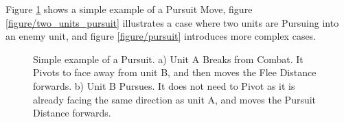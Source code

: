 Figure \ref{figure/simple_pursuit} shows a simple example of a Pursuit Move, figure \ref{figure/two_units_pursuit} illustrates a case where two units are Pursuing into an enemy unit, and figure \ref{figure/pursuit} introduces more complex cases.

\newcommand{\figSimplePursA}{a)}
\newcommand{\figSimplePursB}{b)}

\begin{figure}[!htbp]
	\begin{minipage}{0.52\textwidth}
	\renewcommand{\figbiglettersize}{17}
	\def\svgwidth{\textwidth}
	
	\end{minipage}\hfill\begin{minipage}{0.45\textwidth}
	\caption{Simple example of a Pursuit.\captionpar
	a) Unit A Breaks from Combat. It Pivots to face away from unit B, and then moves the Flee Distance forwards.\captionpar
	b) Unit B Pursues. It does not need to Pivot as it is already facing the same direction as unit A, and moves the Pursuit Distance forwards.}
	\label{figure/simple_pursuit}
	\end{minipage}
\end{figure}


\newcommand{\figTwoPursA}{a)}
\newcommand{\figTwoPursB}{b)}
\newcommand{\figTwoPursC}{c)}
\newcommand{\figTwoPursOne}{\Largefontsize{}\textbf{1}}
\newcommand{\figTwoPursTwo}{\Largefontsize{}\textbf{2}}
\newcommand{\figTwoPursunitA}{\begin{minipage}{0.30\unitlength}\begin{center}\normalfontsize{}Pursuit Distance\par Unit A\end{center}\end{minipage}}
\newcommand{\figTwoPursunitB}{\begin{minipage}{0.30\unitlength}\begin{center}\normalfontsize{}Pursuit Distance\par Unit B\end{center}\end{minipage}}
\newcommand{\figTwoPursunitC}{\begin{minipage}{0.30\unitlength}\begin{center}\normalfontsize{}Pursuit Distance\par Unit C\end{center}\end{minipage}}
\newcommand{\figTwoPursunitD}{\begin{minipage}{0.30\unitlength}\begin{center}\normalfontsize{}Flee Distance\par Unit D\end{center}\end{minipage}}

